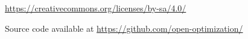\doclicenseLongText

\bigskip

\begin{center}
\url{https://creativecommons.org/licenses/by-sa/4.0/}
\end{center}

\vfill

\begin{center}
{\small Source code available at \url{https://github.com/open-optimization/}}
\end{center}

\vspace{1cm}

\newpage

%
